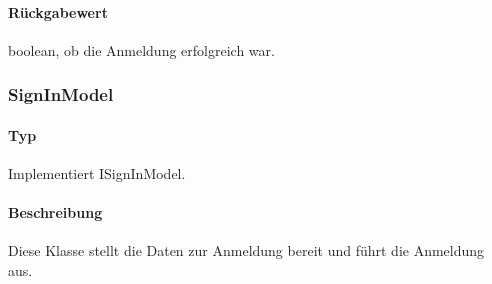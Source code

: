\paragraph*{Rückgabewert}
boolean, ob die Anmeldung erfolgreich war.

\subsubsection{SignInModel}
\paragraph*{Typ}
Implementiert ISignInModel.
\paragraph*{Beschreibung}
Diese Klasse stellt die Daten zur Anmeldung bereit und führt die Anmeldung aus.